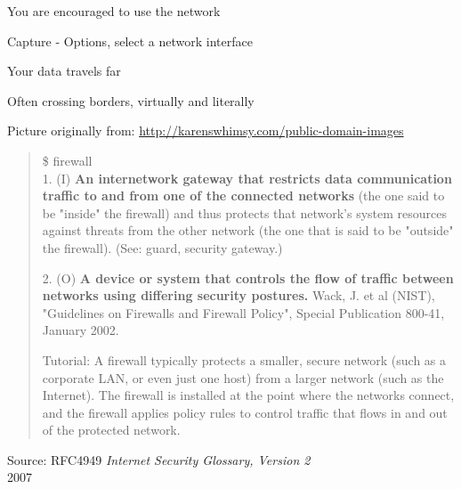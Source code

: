 \documentclass[Screen16to9,17pt]{foils}
\begin{document}
You are encouraged to use the network



\centerline{Capture - Options, select a network interface}
\centerline{}




\begin{list2}
\item Your data travels far
\item Often crossing borders, virtually and literally
\end{list2}



\centerline{Picture originally from: \url{http://karenswhimsy.com/public-domain-images}}



\begin{quote}\small
\$ firewall\\

1. (I) {\bf An internetwork gateway that restricts data communication traffic to and from one of the connected networks} (the one said to be "inside" the firewall) and thus protects that network's system resources against threats from the other network (the one that is said to be "outside" the firewall). (See: guard, security gateway.)

2. (O) {\bf A device or system that controls the flow of traffic between networks using differing security postures.} Wack, J. et al (NIST), "Guidelines on Firewalls and Firewall Policy", Special Publication 800-41, January 2002.

Tutorial: A firewall typically protects a smaller, secure network (such as a corporate LAN, or even just one host) from a larger network (such as the Internet). The firewall is installed at the point where the networks connect, and the firewall applies policy rules to control traffic that flows in and out of the protected network.
\end{quote}
{\footnotesize Source: RFC4949 \emph{Internet Security Glossary, Version 2}\\
 2007}
\end{document}
